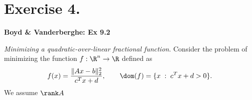 \section*{Exercise 4.}

\textbf{Boyd \& Vanderberghe: Ex 9.2 }

\textit{Minimizing a quadratic-over-linear fractional function}. Consider the problem of minimizing the function $f:\R^n \to \R$ defined as
\[ f(x) = \frac{\|Ax-b\|_2^2}{c^T x+ d},\hspace{2em}  \dom(f) = \{x \;:\; c^T x + d > 0\}.\] 
We assume $\rank A$